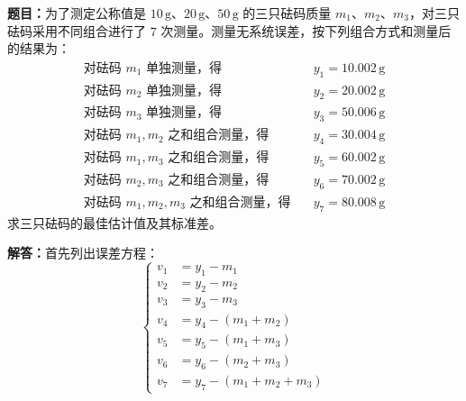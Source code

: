 \documentclass[UTF8,zihao=-4]{ctexart}
\newcommand{\timu}{\noindent\textbf{题目：}}
\newcommand{\jieda}{\noindent\textbf{解答：}}
\begin{document}
\timu 为了测定公称值是 $10\,\mathrm{g}$、$20\,\mathrm{g}$、$50\,\mathrm{g}$ 的三只砝码质量 $m_1$、$m_2$、$m_3$，对三只砝码采用不同组合进行了 $7$ 次测量。测量无系统误差，按下列组合方式和测量后的结果为：
\begin{equation*}
\begin{aligned}
    \text{对砝码 }m_1\text{ 单独测量，得}\quad &y_1=10.002\,\mathrm{g}\\
    \text{对砝码 }m_2\text{ 单独测量，得}\quad &y_2=20.002\,\mathrm{g}\\
    \text{对砝码 }m_3\text{ 单独测量，得}\quad &y_3=50.006\,\mathrm{g}\\
    \text{对砝码 }m_1,m_2\text{ 之和组合测量，得}\quad &y_4=30.004\,\mathrm{g}\\
    \text{对砝码 }m_1,m_3\text{ 之和组合测量，得}\quad &y_5=60.002\,\mathrm{g}\\
    \text{对砝码 }m_2,m_3\text{ 之和组合测量，得}\quad &y_6=70.002\,\mathrm{g}\\
    \text{对砝码 }m_1,m_2,m_3\text{ 之和组合测量，得}\quad &y_7=80.008\,\mathrm{g}
\end{aligned}
\end{equation*}
求三只砝码的最佳估计值及其标准差。

\jieda 首先列出误差方程：
\begin{equation*}
\left\{
\begin{aligned}
    v_1&=y_1-m_1\\
    v_2&=y_2-m_2\\
    v_3&=y_3-m_3\\
    v_4&=y_4-(m_1+m_2)\\
    v_5&=y_5-(m_1+m_3)\\
    v_6&=y_6-(m_2+m_3)\\
    v_7&=y_7-(m_1+m_2+m_3)
\end{aligned}
\right.
\end{equation*}
\end{document}
